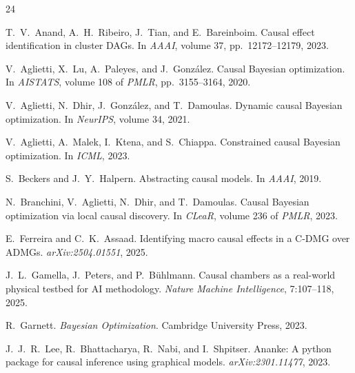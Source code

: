 \documentclass{article}
\begin{document}

\begin{thebibliography}{24}

T.~V.~Anand, A.~H.~Ribeiro, J.~Tian, and E.~Bareinboim.
\newblock Causal effect identification in cluster {DAG}s.
\newblock In \emph{AAAI}, volume 37, pp.\ 12172--12179, 2023.

V.~Aglietti, X.~Lu, A.~Paleyes, and J.~Gonz{\'a}lez.
\newblock Causal {B}ayesian optimization.
\newblock In \emph{AISTATS}, volume 108 of \emph{PMLR}, pp.\ 3155--3164, 2020.

V.~Aglietti, N.~Dhir, J.~Gonz{\'a}lez, and T.~Damoulas.
\newblock Dynamic causal {B}ayesian optimization.
\newblock In \emph{NeurIPS}, volume 34, 2021.

V.~Aglietti, A.~Malek, I.~Ktena, and S.~Chiappa.
\newblock Constrained causal {B}ayesian optimization.
\newblock In \emph{ICML}, 2023.

S.~Beckers and J.~Y.~Halpern.
\newblock Abstracting causal models.
\newblock In \emph{AAAI}, 2019.

N.~Branchini, V.~Aglietti, N.~Dhir, and T.~Damoulas.
\newblock Causal {B}ayesian optimization via local causal discovery.
\newblock In \emph{CLeaR}, volume 236 of \emph{PMLR}, 2023.

E.~Ferreira and C.~K.~Assaad.
\newblock Identifying macro causal effects in a {C-DMG} over {ADMG}s.
\newblock \emph{arXiv:2504.01551}, 2025.

J.~L.~Gamella, J.~Peters, and P.~B{\"u}hlmann.
\newblock Causal chambers as a real-world physical testbed for {AI}
methodology.
\newblock \emph{Nature Machine Intelligence}, 7:107--118, 2025.

R.~Garnett.
\newblock \emph{Bayesian Optimization}.
\newblock Cambridge University Press, 2023.

J.~J.~R.~Lee, R.~Bhattacharya, R.~Nabi, and I.~Shpitser.
\newblock Ananke: A python package for causal inference using graphical
models.
\newblock \emph{arXiv:2301.11477}, 2023.


\end{thebibliography}
\end{document}
